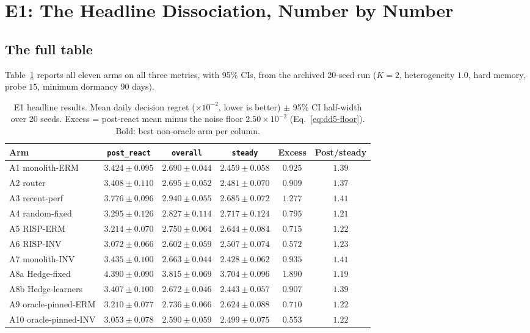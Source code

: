 \section{E1: The Headline Dissociation, Number by Number}
\label{sec:dd5-e1}

\subsection{The full table}
\label{sec:dd5-e1-table}

Table~\ref{tab:dd5-e1-main} reports all eleven arms on all three metrics,
with 95\% CIs, from the archived 20-seed run ($K=2$, heterogeneity $1.0$,
hard memory, probe $15$, minimum dormancy $90$ days).

\begin{table}[h]
\centering
\caption{E1 headline results. Mean daily decision regret ($\times 10^{-2}$,
lower is better) $\pm$ 95\% CI half-width over 20 seeds. Excess = post-react
mean minus the noise floor $2.50 \times 10^{-2}$
(Eq.~\eqref{eq:dd5-floor}). Bold: best non-oracle arm per column.}
\label{tab:dd5-e1-main}
\small
\begin{tabular}{lccccc}
\toprule
Arm & \texttt{post\_react} & \texttt{overall} & \texttt{steady} &
Excess & Post/steady \\
\midrule
A1 monolith-ERM      & $3.424 \pm 0.095$ & $2.690 \pm 0.044$ & $2.459 \pm 0.058$ & $0.925$ & $1.39$ \\
A2 router            & $3.408 \pm 0.110$ & $2.695 \pm 0.052$ & $2.481 \pm 0.070$ & $0.909$ & $1.37$ \\
A3 recent-perf       & $3.776 \pm 0.096$ & $2.940 \pm 0.055$ & $2.685 \pm 0.072$ & $1.277$ & $1.41$ \\
A4 random-fixed      & $3.295 \pm 0.126$ & $2.827 \pm 0.114$ & $2.717 \pm 0.124$ & $0.795$ & $1.21$ \\
A5 RISP-ERM      & $3.214 \pm 0.070$ & $2.750 \pm 0.064$ & $2.644 \pm 0.084$ & $0.715$ & $1.22$ \\
A6 RISP-INV      & $\mathbf{3.072 \pm 0.066}$ & $\mathbf{2.602 \pm 0.059}$ & $2.507 \pm 0.074$ & $\mathbf{0.572}$ & $1.23$ \\
A7 monolith-INV      & $3.435 \pm 0.100$ & $2.663 \pm 0.044$ & $\mathbf{2.428 \pm 0.062}$ & $0.935$ & $1.41$ \\
A8a Hedge-fixed      & $4.390 \pm 0.090$ & $3.815 \pm 0.069$ & $3.704 \pm 0.096$ & $1.890$ & $1.19$ \\
A8b Hedge-learners   & $3.407 \pm 0.100$ & $2.672 \pm 0.046$ & $2.443 \pm 0.057$ & $0.907$ & $1.39$ \\
\midrule
A9 oracle-pinned-ERM & $3.210 \pm 0.077$ & $2.736 \pm 0.066$ & $2.624 \pm 0.088$ & $0.710$ & $1.22$ \\
A10 oracle-pinned-INV& $3.053 \pm 0.078$ & $2.590 \pm 0.059$ & $2.499 \pm 0.075$ & $0.553$ & $1.22$ \\
\bottomrule
\end{tabular}
\end{table}

